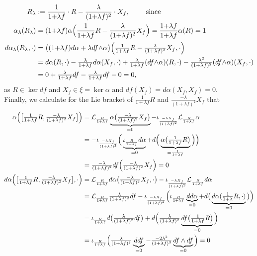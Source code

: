\documentclass[a4paper,12pt,bibliography=totocnumbered,titlepage=false,abstracton,bookmarksnumbered=true]{scrartcl}
\theoremstyle{definition}
\begin{document}
\begin{align*}
R_\lambda&:=\frac{1}{1{+}\lambda f}\cdot R-\frac{\lambda}{(1{+}\lambda f)^2}\cdot X_{f}, \qquad\text{ since}\\
 \alpha_\lambda(R_\lambda) &= (1{+}\lambda f)\alpha\Big(\frac{1}{1{+}\lambda f}R-\frac{\lambda}{(1{+}\lambda f)^2}X_{f}\Big)=\frac{1{+}\lambda f}{1{+}\lambda f}\alpha(R)=1\allowdisplaybreaks\\
 d\alpha_\lambda (R_\lambda,\cdot) &=\big((1{+}\lambda f)d\alpha+\lambda df{\wedge}\alpha\big)\Big({\textstyle\frac{1}{1+\lambda f}}R-{\textstyle \frac{\lambda}{(1+\lambda f)^2}} X_{f} , \cdot\Big)\\
 &= d\alpha(R,\cdot)-{\textstyle \frac{\lambda}{1+\lambda f}} d\alpha(X_{f},\cdot)+{\textstyle \frac{\lambda}{1+\lambda f}}(df{\wedge}\alpha)(R,\cdot)-{\textstyle\frac{\lambda^2}{(1+\lambda f)^2}}(df{\wedge}\alpha)(X_{f},\cdot)\\
 &= 0 + {\textstyle \frac{\lambda}{1+\lambda f}}df-{\textstyle\frac{\lambda}{1+\lambda f}}df-0 =0,
\end{align*}
as $R\in\ker df$ and $X_{f}\in\xi=\ker \alpha$ and $df(X_{f})=d\alpha(X_{f},X_{f})=0$.\\ Finally, we calculate for the Lie bracket of $\frac{1}{1+\lambda f}R$ and $\frac{-\lambda}{(1+\lambda f)^2}X_{f}$ that
\begin{align*}
 \alpha\Big(\big[{\textstyle\frac{1}{1+\lambda f}}R, {\textstyle\frac{-\lambda}{(1+\lambda f)^2}} X_{f}\big]\Big) &=\mathcal{L}_{\frac{R}{1+\lambda f}} \underbrace{\alpha\big({\textstyle\frac{-\lambda}{(1+\lambda f)^2}} X_{f}\big)}_{=0}-\iota_{\frac{-\lambda X_{f}}{(1+\lambda f)^2}}\mathcal{L}_{\frac{R}{1+\lambda f}} \alpha\\
 &=-\iota_{\frac{-\lambda X_{f}}{(1+\lambda f)^2}}\Big(\underbrace{\iota_{\frac{R}{1+\lambda f}} d\alpha}_{=0}+d\Big(\underbrace{\alpha\big({\textstyle\frac{1}{1+\lambda f}}R\big)}_{=\frac{1}{1+\lambda f}}\Big)\Big)\\
 &={\textstyle \frac{-\lambda}{(1+\lambda f)^2}} df\Big({\textstyle \frac{-\lambda}{(1+\lambda f)^2}} X_{f}\Big)=0\allowdisplaybreaks\\
 d\alpha\Big(\big[{\textstyle\frac{1}{1+\lambda f}}R, {\textstyle\frac{-\lambda}{(1+\lambda f)^2}} X_{f}\big],\cdot\Big) &=\mathcal{L}_{\frac{R}{1+\lambda f}} d\alpha\big({\textstyle\frac{-\lambda}{(1+\lambda f)^2}} X_{f},\cdot\big)-\iota_{\frac{-\lambda X_{f}}{(1+\lambda f)^2}}\mathcal{L}_{\frac{R}{1+\lambda f}} d\alpha\\
 &=\mathcal{L}_{\frac{R}{1+\lambda f}} {\textstyle\frac{\lambda}{(1+\lambda f)^2}} df-\iota_{\frac{-\lambda X_{f}}{(1+\lambda f)^2}}\Big(\iota_{\frac{R}{1+\lambda f}}\underbrace{dd\alpha}_{=0}+d\big(\underbrace{d\alpha({\textstyle\frac{1}{1+\lambda}}R,\cdot)}_{=0}\big)\Big)\\
 &=\iota_{\frac{R}{1+\lambda f}}d\big({\textstyle\frac{\lambda}{(1+\lambda f)^2}}df\big)+d\Big({\textstyle\frac{\lambda}{(1+\lambda f)^2}} \underbrace{df\big({\textstyle\frac{1}{1+\lambda f}}R\big)}_{=0}\Big)\\
 &=\iota_{\frac{R}{1+\lambda f}}\Big({\textstyle\frac{\lambda}{(1+\lambda f)^2}}\underbrace{dd f}_{=0}-{\textstyle\frac{-2\lambda^2}{(1+\lambda f)^3}}\underbrace{df\wedge df}_{=0}\Big)=0
 \end{align*}
\end{document}

